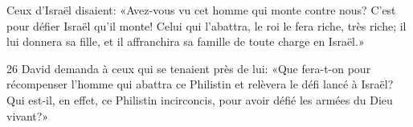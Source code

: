 Ceux d’Israël disaient: «Avez-vous vu cet homme qui monte contre nous? C’est pour défier Israël qu’il monte! Celui qui l’abattra, le roi le fera riche, très riche; il lui donnera sa fille, et il affranchira sa famille de toute charge en Israël.»

26 David demanda à ceux qui se tenaient près de lui: «Que fera-t-on pour récompenser l’homme qui abattra ce Philistin et relèvera le défi lancé à Israël? Qui est-il, en effet, ce Philistin incirconcis, pour avoir défié les armées du Dieu vivant?»
